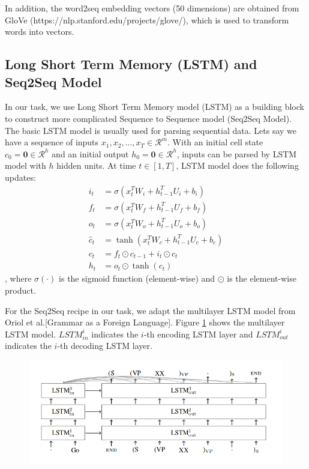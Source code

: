 \documentclass{article}
\begin{document}
In addition, the word2seq embedding vectors (50 dimensions) are obtained from GloVe (https://nlp.stanford.edu/projects/glove/), which is used to transform words into vectors. 

\subsection{Long Short Term Memory (LSTM) and Seq2Seq Model}
In our task, we use Long Short Term Memory model (LSTM) as a building block to construct more complicated Sequence to Sequence model (Seq2Seq Model). The basic LSTM model is usually used for parsing sequential data. Lets say we have a sequence of inputs $x_1, x_2, ..., x_T \in \mathcal{R}^{m}$. With an initial cell state $c_0 = \mathbf{0} \in \mathcal{R}^{h}$ and an initial output $h_0 = \mathbf{0} \in \mathcal{R}^{h}$, inputs can be parsed by LSTM model with $h$ hidden units. At time $t \in [1, T]$, LSTM model does the following updates:
\begin{align*}
i_t &= \sigma(x_{t}^{T}W_i + h_{t-1}^{T}U_i + b_i)\\
f_t &= \sigma(x_{t}^{T}W_f + h_{t-1}^{T}U_f + b_f)\\
o_t &= \sigma(x_{t}^{T}W_o + h_{t-1}^{T}U_o + b_o)\\
\hat c_t &= \tanh(x_{t}^{T}W_c + h_{t-1}^{T}U_c + b_c)\\
c_t &= f_t \odot c_{t-1} + i_t \odot \hat c_t\\
h_t &= o_t \odot \tanh(c_t)
\end{align*}
, where $\sigma(\cdot)$ is the sigmoid function (element-wise) and $\odot$ is the element-wise product.

For the Seq2Seq recipe in our task, we adapt the multilayer LSTM model 
from Oriol et al.[Grammar as a Foreign Language]. Figure \ref{fig:LSTM_A} shows the multilayer LSTM model. $LSTM_{in}^{i}$ indicates the $i$-th encoding LSTM layer and $LSTM_{out}^{i}$ indicates the $i$-th decoding LSTM layer.
\begin{figure}[h]
	\centering
	\includegraphics[width=0.7\linewidth]{LSTM_A}
	\caption{}
	\label{fig:LSTM_A}
\end{figure}
\end{document}

